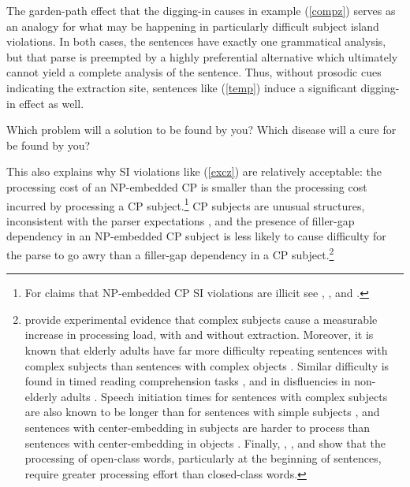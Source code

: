 \documentclass[output=paper]{langsci/langscibook}
\begin{document}
\noindent
The garden-path effect that the digging-in causes in example (\ref{compz}) serves as
 an  analogy for what may be happening in particularly difficult  subject island violations. 
In both cases,  the sentences have exactly one grammatical analysis, but that parse
 is preempted by a highly preferential alternative  which  ultimately cannot yield a 
 complete analysis of the sentence.  Thus, without prosodic cues indicating
 the extraction site, sentences like (\ref{temp}) induce a significant digging-in effect
 as well.


\ea
\ea \bad{*}Which problem will a solution to be found by you?
\ex \bad{*}Which  disease will  a cure for be found by you?
\z  \label{temp}
\z

This also explains why SI violations like  (\ref{excz}) are relatively acceptable: the  processing cost of an NP-embedded CP  is smaller than the processing cost incurred by processing a CP subject.\footnote{For claims that NP-embedded CP SI violations are illicit see  \citep[42]{lasniksaito},   \citep[796]{colinphillips}, and    \citep[67]{colin_horn}.}  CP subjects are unusual structures, inconsistent with the parser expectations \citep{fod74},  and   the presence of filler-gap dependency in an  NP-embedded CP subject is less likely
to cause  difficulty for the parse to go awry than a  filler-gap dependency in a CP subject.\footnote{\citet{clausen,clausencuny} provide  experimental evidence that  complex subjects cause  a measurable increase in processing load,  with and without extraction. Moreover,  it is known that 
elderly adults  have far more difficulty repeating sentences with complex subjects than sentences with complex objects  \citep{kemper86}. Similar difficulty is  found in timed reading comprehension tasks  \citep{kynette}, and in   disfluencies in non-elderly adults \citep{clarkwasow}. 
Speech initiation times  for sentences with complex subjects are
also known to be longer than for sentences with 
 simple subjects  \citep{ferreirasubj,tsiam},
 and sentences with center-embedding in subjects 
are harder to process than sentences 
with center-embedding in objects \citep{amy,eady}.
Finally,  \citet{garnsey}, \citet{kutasetal}, and \citet{vanpetten}  show
that the processing of open-class words, particularly at
the beginning of sentences, require
greater processing effort than closed-class words.}
\end{document}
